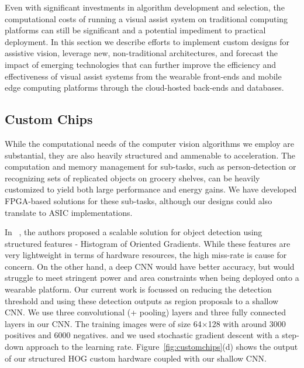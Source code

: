 Even with significant investments in algorithm development and
selection, the computational costs of running a visual assist system
on traditional computing platforms can still be significant and a
potential impediment to practical deployment. In this section we
describe efforts to implement custom designs for assistive vision,
leverage new, non-traditional architectures, and forecast the impact
of emerging technologies that can further improve the efficiency and
effectiveness of visual assist systems from the wearable front-ends
and mobile edge computing platforms through the cloud-hosted back-ends
and databases.

\subsection{Custom Chips}
While the computational needs of the computer vision algorithms we
employ are substantial, they are also heavily structured and ammenable
to acceleration. The computation and memory management for sub-tasks,
such as person-detection or recognizing sets of replicated objects on
grocery shelves, can be heavily customized to yield both large
performance and energy gains. We have developed FPGA-based solutions
for these sub-tasks, although our designs could also translate to ASIC
implementations.

In ~\cite{fpl2015}, the authors proposed a scalable solution for object 
detection using structured features - Histogram of Oriented Gradients.
While these features are very lightweight in terms of hardware resources, 
the high miss-rate is cause for concern. On the other hand, a deep CNN 
would have better accuracy, but would struggle to meet stringent power 
and area constraints when being deployed onto a wearable platform. Our 
current work is focussed on reducing the detection threshold and using 
these detection outputs as region proposals to a shallow CNN. 
We use three convolutional (+ pooling) layers and three fully connected layers in our CNN. 
The training images were of size 64$\times$128 with around 3000 positives and 6000 negatives.
and we used stochastic gradient descent with a step-down approach to the learning rate. 
Figure~\ref{fig:customchips}(d) shows the output of our structured HOG
custom hardware coupled with our shallow CNN.

